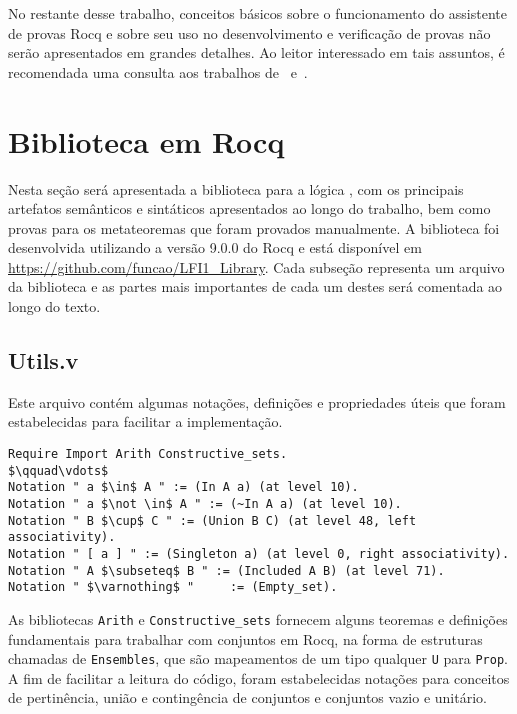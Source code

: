     No restante desse trabalho, conceitos básicos sobre o funcionamento do assistente de provas Rocq e sobre seu uso no desenvolvimento e verificação de provas não serão apresentados em grandes detalhes. Ao leitor interessado em tais assuntos, é recomendada uma consulta aos trabalhos de~ e~.

\section{Biblioteca em Rocq}\label{sec:biblioteca}
    Nesta seção será apresentada a biblioteca para a lógica \lfium{}, com os principais artefatos semânticos e sintáticos apresentados ao longo do trabalho, bem como provas para os metateoremas que foram provados manualmente. A biblioteca foi desenvolvida utilizando a versão 9.0.0 do Rocq e está disponível em \url{https://github.com/funcao/LFI1_Library}. Cada subseção representa um arquivo da biblioteca e as partes mais importantes de cada um destes será comentada ao longo do texto.

    \subsection{Utils.v}\label{sec:utils}

      Este arquivo contém algumas notações, definições e propriedades úteis que foram estabelecidas para facilitar a implementação.

      \begin{lstlisting}[name=Utils, frame=single, language=coq]
Require Import Arith Constructive_sets.
$\qquad\vdots$
Notation " a $\in$ A " := (In A a) (at level 10).
Notation " a $\not \in$ A " := (~In A a) (at level 10).
Notation " B $\cup$ C " := (Union B C) (at level 48, left associativity).
Notation " [ a ] " := (Singleton a) (at level 0, right associativity).
Notation " A $\subseteq$ B " := (Included A B) (at level 71). 
Notation " $\varnothing$ "     := (Empty_set).
      \end{lstlisting}

      As bibliotecas \texttt{Arith} e \texttt{Constructive\_sets} fornecem alguns teoremas e definições fundamentais para trabalhar com conjuntos em Rocq, na forma de estruturas chamadas de \texttt{Ensembles}, que são mapeamentos de um tipo qualquer \texttt{U} para \texttt{Prop}. A fim de facilitar a leitura do código, foram estabelecidas notações para conceitos de pertinência, união e contingência de conjuntos e conjuntos vazio e unitário.

